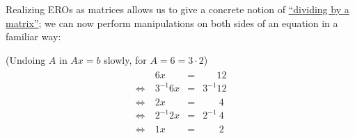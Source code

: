 Realizing EROs as matrices allows us to give a concrete notion of \hyperlink{ch1divide}{``dividing by a matrix''}; we can now perform manipulations on both sides of an equation in a familiar way:

\begin{example} (Undoing $A$ in $Ax=b$ slowly, for $A=6=3\cdot2$)
\begin{equation*}\begin{array}{crcr}
&6x&=&\phantom{ 3^{-1}} 12 \\[2mm]
\Leftrightarrow\ &3^{-1}6x&=&3^{-1}12 \\[2mm]
\Leftrightarrow\ & 2x&=&\phantom{3^{-1}~}4  \\[2mm]
\Leftrightarrow\ & 2^{-1}2x&=&2^{-1}~4\\[2mm] %
\Leftrightarrow\ &  1x&=&\phantom{3^{-1}~} 2
\end{array}
\end{equation*}
\end{example}

